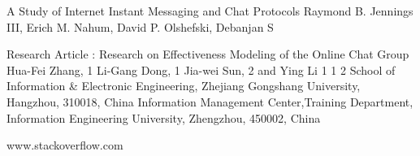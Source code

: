 \documentclass{SureshLimkar}
\begin{document}
\begin{thebibliography}{9}
A Study of Internet Instant Messaging and Chat Protocols Raymond B.
Jennings III, Erich M. Nahum, David P. Olshefski, Debanjan S

Research Article : Research on Effectiveness Modeling of the Online
Chat Group Hua-Fei Zhang, 1 Li-Gang Dong, 1 Jia-wei Sun, 2 and
Ying Li 1 1 2 School of Information & Electronic Engineering, Zhejiang
Gongshang University, Hangzhou, 310018, China Information
Management Center,Training Department, Information Engineering
University, Zhengzhou, 450002, China

www.stackoverflow.com
\end{thebibliography}

\newpage
\end{document}
